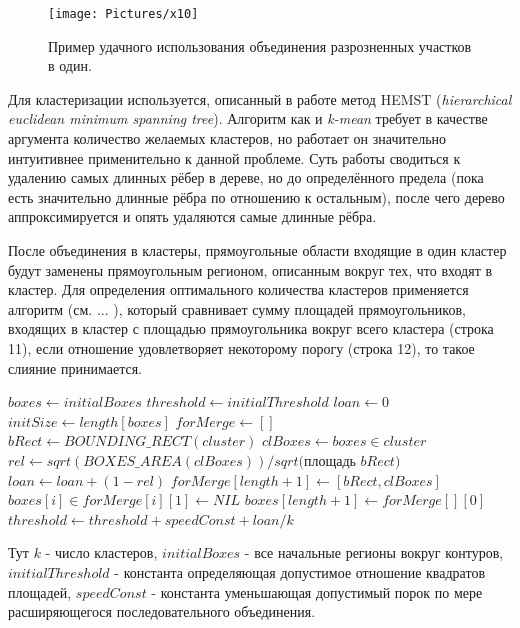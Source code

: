\documentclass[12pt]{report}
\begin{document}
\begin{figure}[h]
	\centering
	\texttt{[image: Pictures/x10]}
	\caption{Пример удачного использования объединения разрозненных участков в один.}
	\label{fig:cluster_example}
\end{figure}

Для кластеризации используется, описанный в работе \citep{grygorash2006minimum} метод HEMST (\textit{hierarchical 
euclidean minimum spanning tree}). Алгоритм как и \textit{k-mean} требует в качестве аргумента количество желаемых 
кластеров, но работает он значительно интуитивнее применительно к данной проблеме. Суть работы сводиться к удалению 
самых длинных рёбер в дереве, но до определённого предела (пока есть значительно длинные рёбра по отношению к 
остальным), после чего дерево аппроксимируется и опять удаляются самые длинные рёбра.

После объединения в кластеры, прямоугольные области входящие в один кластер будут заменены прямоугольным регионом, 
описанным вокруг тех, что входят в кластер. Для определения оптимального количества кластеров применяется алгоритм 
(см. ... ), который сравнивает сумму площадей прямоугольников, входящих в кластер с площадью прямоугольника вокруг 
всего кластера (строка 11), если отношение удовлетворяет некоторому порогу (строка 12), то такое слияние принимается.
\begin{algorithmic}[1]
\STATE $boxes \gets initialBoxes$
\STATE $threshold \gets initialThreshold$
\STATE $loan \gets 0$
\REPEAT
\STATE $initSize \gets length[boxes]$
\STATE $forMerge \gets []$
\STATE $bRect\gets BOUNDING\_RECT(cluster)$
\STATE $clBoxes\gets boxes \in cluster$
\STATE $rel\gets sqrt(BOXES\_AREA(clBoxes))/sqrt($площадь $bRect)$
\STATE $loan \gets loan + (1 - rel)$
\STATE $forMerge[length+1] \gets [bRect, clBoxes]$
\ENDIF
\ENDFOR
\STATE $boxes[i] \in forMerge[i][1] \gets NIL$
\STATE $boxes[length+1] \gets forMerge[][0]$
\STATE $threshold \gets threshold + speedConst + loan/k$
\ENDFOR
{}
\end{algorithmic}
Тут $k$ - число кластеров, $initialBoxes$ - все начальные регионы вокруг контуров, $initialThreshold$ - константа 
определяющая допустимое отношение квадратов площадей, $speedConst$ - константа уменьшающая допустимый порок по мере 
расширяющегося последовательного объединения. 
\end{document}
